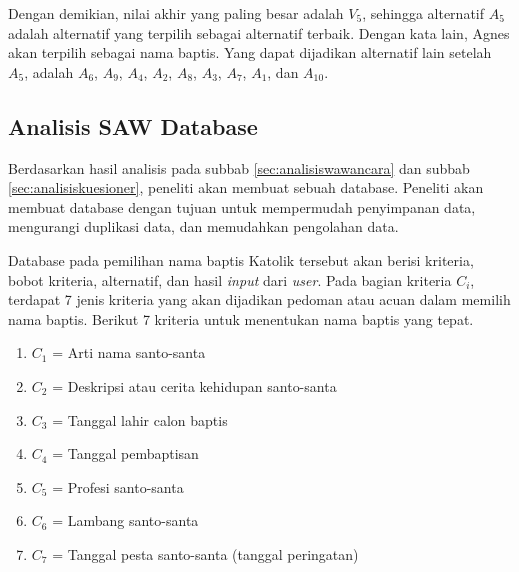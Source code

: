 Dengan demikian, nilai akhir yang paling besar adalah $V_{5}$, sehingga alternatif $A_{5}$ adalah alternatif yang terpilih sebagai alternatif terbaik. Dengan kata lain, Agnes akan terpilih sebagai nama baptis. Yang dapat dijadikan alternatif lain setelah $A_{5}$, adalah $A_{6}$, $A_{9}$, $A_{4}$, $A_{2}$, $A_{8}$, $A_{3}$, $A_{7}$, $A_{1}$, dan $A_{10}$. 

\subsection{Analisis SAW Database}
\label{sec:analisissdb}

Berdasarkan hasil analisis pada subbab \ref{sec:analisiswawancara} dan subbab \ref{sec:analisiskuesioner}, peneliti akan membuat sebuah database. Peneliti akan membuat database dengan tujuan untuk mempermudah penyimpanan data, mengurangi duplikasi data, dan memudahkan pengolahan data. 

Database pada pemilihan nama baptis Katolik tersebut akan berisi kriteria, bobot kriteria, alternatif, dan hasil \textit{input} dari \textit{user}. %
Pada bagian kriteria $C_{i}$, terdapat 7 jenis kriteria yang akan dijadikan pedoman atau acuan dalam memilih nama baptis. Berikut 7 kriteria untuk menentukan nama baptis yang tepat.
\begin{enumerate}
	\item $C_{1}$ = Arti nama santo-santa
	\item $C_{2}$ = Deskripsi atau cerita kehidupan santo-santa
	\item $C_{3}$ = Tanggal lahir calon baptis
	\item $C_{4}$ = Tanggal pembaptisan
	\item $C_{5}$ = Profesi santo-santa
	\item $C_{6}$ = Lambang santo-santa
	\item $C_{7}$ = Tanggal pesta santo-santa (tanggal peringatan)
\end{enumerate}


